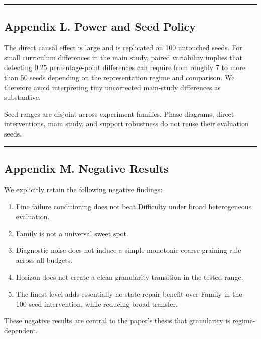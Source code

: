 \documentclass[
]{article}
\providecommand{\tightlist}{%
  \setlength{\itemsep}{0pt}\setlength{\parskip}{0pt}}
\begin{document}
\begin{center}\rule{0.5\linewidth}{0.5pt}\end{center}

\subsection{Appendix L. Power and Seed
Policy}\label{appendix-l.-power-and-seed-policy}

The direct causal effect is large and is replicated on 100 untouched
seeds. For small curriculum differences in the main study, paired
variability implies that detecting 0.25 percentage-point differences can
require from roughly 7 to more than 50 seeds depending on the
representation regime and comparison. We therefore avoid interpreting
tiny uncorrected main-study differences as substantive.

Seed ranges are disjoint across experiment families. Phase diagrams,
direct interventions, main study, and support robustness do not reuse
their evaluation seeds.

\begin{center}\rule{0.5\linewidth}{0.5pt}\end{center}

\subsection{Appendix M. Negative
Results}\label{appendix-m.-negative-results}

We explicitly retain the following negative findings:

\begin{enumerate}
\def\labelenumi{\arabic{enumi}.}
\tightlist
\item
  Fine failure conditioning does not beat Difficulty under broad
  heterogeneous evaluation.
\item
  Family is not a universal sweet spot.
\item
  Diagnostic noise does not induce a simple monotonic coarse-graining
  rule across all budgets.
\item
  Horizon does not create a clean granularity transition in the tested
  range.
\item
  The finest level adds essentially no state-repair benefit over Family
  in the 100-seed intervention, while reducing broad transfer.
\end{enumerate}

These negative results are central to the paper's thesis that
granularity is regime-dependent.
\end{document}
